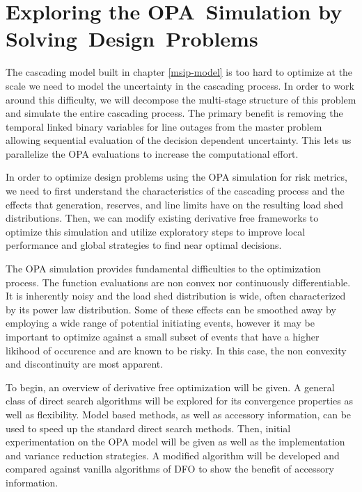 \newcommand{\mypathdfo}{../thesis/dfo}
\newcommand{\mypathdfodata}{../thesis/dfo/data}
\newcommand{\scd}{\cD_\oplus}
\newcommand{\btu}{\bigtriangleup}
\chapter{Exploring the OPA~Simulation by Solving~Design~Problems}

The cascading model built in chapter \ref{msip-model} is too hard to optimize at the scale we need to model the uncertainty in the cascading process.  In order to work around this difficulty, we will decompose the multi-stage structure of this problem and simulate the entire cascading process.  The primary benefit is removing the temporal linked binary variables for line outages from the master problem allowing sequential evaluation of the decision dependent uncertainty.  This lets us parallelize the OPA evaluations to increase the computational effort.

In order to optimize design problems using the OPA simulation for risk metrics, we need to first understand the characteristics of the cascading process and the effects that generation, reserves, and line limits have on the resulting load shed distributions.  Then, we can modify existing derivative free frameworks to optimize this simulation and utilize exploratory steps to improve local performance and global strategies to find near optimal decisions.

The OPA simulation provides fundamental difficulties to the optimization process.  The function evaluations are non convex nor continuously differentiable.  It is inherently noisy and the load shed distribution is wide, often characterized by its power law distribution.  Some of these effects can be smoothed away by employing a wide range of potential initiating events, however it may be important to optimize against a small subset of events that have a higher likihood of occurence and are known to be risky.  In this case, the non convexity and discontinuity are most apparent.

To begin, an overview of derivative free optimization will be given.  A general class of direct search algorithms will be explored for its convergence properties as well as flexibility.  Model based methods, as well as accessory information, can be used to speed up the standard direct search methods.  Then, initial experimentation on the OPA model will be given as well as the implementation and variance reduction strategies.  A modified algorithm will be developed and compared against vanilla algorithms of DFO to show the benefit of accessory information. 

